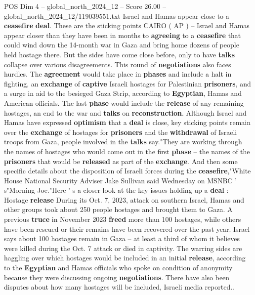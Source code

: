 \begin{textsample}{POS Dim 4 – global\_north\_2024\_12 – Score 26.00 – global\_north\_2024\_12/119039551.txt}  \label{ex:f4_pos_305}
Israel and Hamas appear close to a \textbf{ceasefire} \textbf{deal}.
These are the sticking points CAIRO ( AP ) -- Israel and Hamas appear closer than they have been in months to \textbf{agreeing} to a \textbf{ceasefire} that could wind down the 14-month war in Gaza and bring home dozens of people held hostage there.
But the sides have come close before, only to have \textbf{talks} collapse over various disagreements.
This round of \textbf{negotiations} also faces hurdles.
The \textbf{agreement} would take place in \textbf{phases} and include a halt in fighting, an \textbf{exchange} of \textbf{captive} Israeli hostages for Palestinian \textbf{prisoners}, and a surge in aid to the besieged Gaza Strip, according to \textbf{Egyptian}, Hamas and American officials.
The last \textbf{phase} would include the \textbf{release} of any remaining hostages, an end to the war and \textbf{talks} on \textbf{reconstruction}.
Although Israel and Hamas have expressed \textbf{optimism} that a \textbf{deal} is close, key sticking points remain over the \textbf{exchange} of hostages for \textbf{prisoners} and the \textbf{withdrawal} of Israeli troops from Gaza, people involved in the \textbf{talks} say."They are working through the names of hostages who would come out in the first \textbf{phase} -- the names of the \textbf{prisoners} that would be \textbf{released} as part of the \textbf{exchange}.
And then some specific details about the disposition of Israeli forces during the \textbf{ceasefire},"White House National Security Adviser Jake Sullivan said Wednesday on MSNBC ' s"Morning Joe."Here ' s a closer look at the key issues holding up a \textbf{deal} : Hostage \textbf{release} During its Oct. 7, 2023, attack on southern Israel, Hamas and other groups took about 250 people hostages and brought them to Gaza.
A previous \textbf{truce} in November 2023 \textbf{freed} more than 100 hostages, while others have been rescued or their remains have been recovered over the past year.
Israel says about 100 hostages remain in Gaza -- at least a third of whom it believes were killed during the Oct. 7 attack or died in captivity.
The warring sides are haggling over which hostages would be included in an initial \textbf{release}, according to the \textbf{Egyptian} and Hamas officials who spoke on condition of anonymity because they were discussing ongoing \textbf{negotiations}.
There have also been disputes about how many hostages will be included, Israeli media reported..

\end{textsample}
